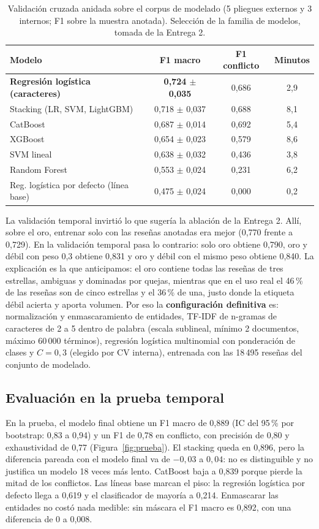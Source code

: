\documentclass[11pt,a4paper]{article}
\begin{document}
\begin{table}[h]
\centering\small
\caption{Validación cruzada anidada sobre el corpus de modelado (5 pliegues externos y 3 internos;
F1 sobre la muestra anotada). Selección de la familia de modelos, tomada de la Entrega 2.}\label{tab:anidada}
\begin{tabular}{lccc}
\toprule
Modelo & F1 macro & F1 conflicto & Minutos \\
\midrule
\textbf{Regresión logística (caracteres)} & \textbf{0,724 $\pm$ 0,035} & 0,686 & 2,9 \\
Stacking (LR, SVM, LightGBM) & 0,718 $\pm$ 0,037 & 0,688 & 8,1 \\
CatBoost & 0,687 $\pm$ 0,014 & 0,692 & 5,4 \\
XGBoost & 0,654 $\pm$ 0,023 & 0,579 & 8,6 \\
SVM lineal & 0,638 $\pm$ 0,032 & 0,436 & 3,8 \\
Random Forest & 0,553 $\pm$ 0,024 & 0,231 & 6,2 \\
Reg. logística por defecto (línea base) & 0,475 $\pm$ 0,024 & 0,000 & 0,2 \\
\bottomrule
\end{tabular}
\end{table}

La validación temporal invirtió lo que sugería la ablación de la Entrega 2. Allí, sobre el oro,
entrenar solo con las reseñas anotadas era mejor (0,770 frente a 0,729). En la validación temporal
pasa lo contrario: solo oro obtiene 0,790, oro y débil con peso 0,3 obtiene 0,831 y oro y débil con
el mismo peso obtiene 0,840. La explicación es la que anticipamos: el oro contiene todas las
reseñas de tres estrellas, ambiguas y dominadas por quejas, mientras que en el uso real el 46\,\% de
las reseñas son de cinco estrellas y el 36\,\% de una, justo donde la etiqueta débil acierta y aporta
volumen. Por eso la \textbf{configuración definitiva} es: normalización y enmascaramiento de
entidades, TF-IDF de n-gramas de caracteres de 2 a 5 dentro de palabra (escala sublineal, mínimo 2
documentos, máximo 60\,000 términos), regresión logística multinomial con ponderación de clases y
$C=0{,}3$ (elegido por CV interna), entrenada con las 18\,495 reseñas del conjunto de modelado.

\subsection{Evaluación en la prueba temporal}
En la prueba, el modelo final obtiene un F1 macro de 0,889 (IC del 95\,\% por bootstrap: 0,83 a
0,94) y un F1 de 0,78 en conflicto, con precisión de 0,80 y exhaustividad de 0,77 (Figura~\ref{fig:prueba}).
El stacking queda en 0,896, pero la diferencia pareada con el modelo final va de $-0{,}03$ a
$0{,}04$: no es distinguible y no justifica un modelo 18 veces más lento. CatBoost baja a 0,839
porque pierde la mitad de los conflictos. Las líneas base marcan el piso: la regresión logística por
defecto llega a 0,619 y el clasificador de mayoría a 0,214. Enmascarar las entidades no costó nada
medible: sin máscara el F1 macro es 0,892, con una diferencia de 0 a 0,008.
\end{document}
